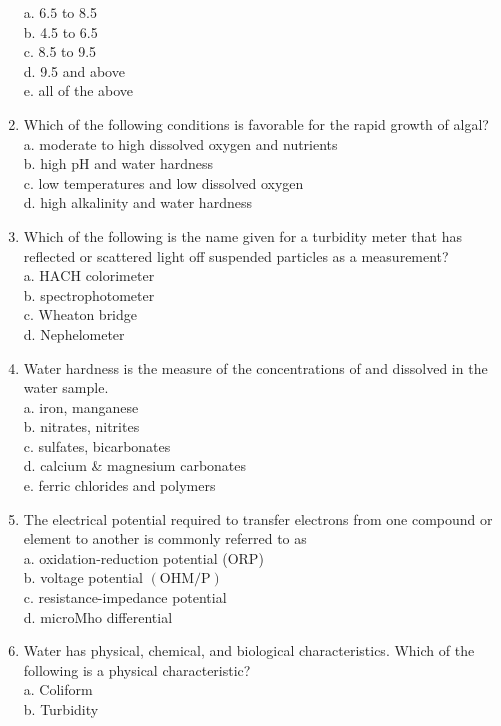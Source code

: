 \begin{enumerate}[1.]
a. $ 6.5$ to 8.5\\
b. 4.5 to 6.5\\
c. 8.5 to 9.5\\
d. 9.5 and above\\
e. all of the above\\
\item Which of the following conditions is favorable for the rapid growth of algal?\\
a. moderate to high dissolved oxygen and nutrients\\
b. high $\mathrm{pH}$ and water hardness\\
c. low temperatures and low dissolved oxygen\\
d. high alkalinity and water hardness\\
\item Which of the following is the name given for a turbidity meter that has reflected or scattered light off suspended particles as a measurement?\\
a. $\mathrm{HACH}$ colorimeter\\
b. spectrophotometer\\
c. Wheaton bridge\\
d. Nephelometer\\
\item Water hardness is the measure of the concentrations of and dissolved in the water sample.\\
a. iron, manganese\\
b. nitrates, nitrites\\
c. sulfates, bicarbonates\\
d. calcium \& magnesium carbonates\\
e. ferric chlorides and polymers\\
\item The electrical potential required to transfer electrons from one compound or element to another is commonly referred to as\\
a. oxidation-reduction potential (ORP)\\
b. voltage potential $(\mathrm{OHM} / \mathrm{P})$\\
c. resistance-impedance potential\\
d. microMho differential\\
\item Water has physical, chemical, and biological characteristics. Which of the following is a physical characteristic?\\
a. Coliform\\
b. Turbidity\\ 

\end{enumerate}
